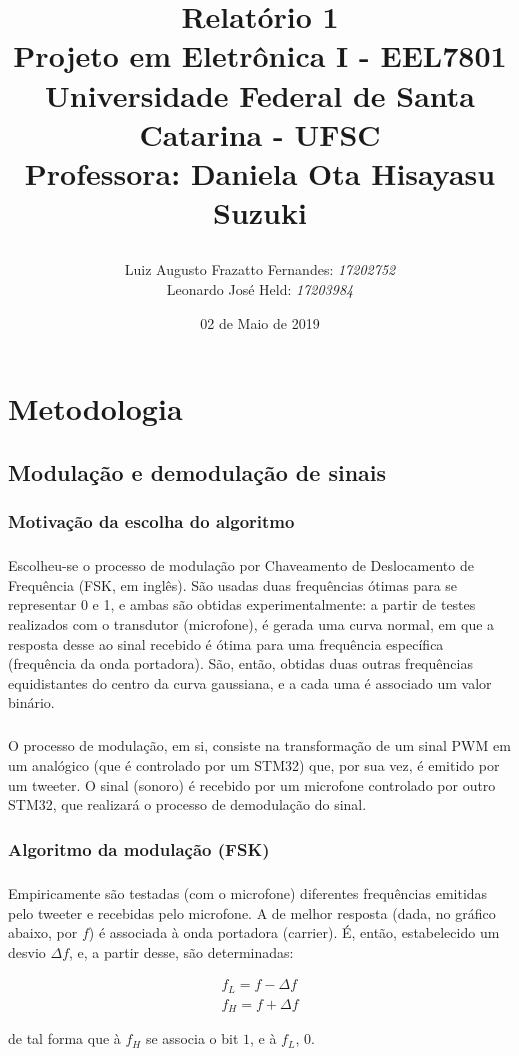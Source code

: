 \documentclass[11pt,a4paper]{report}
\title{Relatório 1  \\
	Projeto em Eletrônica I - EEL7801 \\ \vfill
	\normalsize{Universidade Federal de Santa Catarina - UFSC \\
		Professora: Daniela Ota Hisayasu Suzuki}
	\author{
		{Luiz Augusto Frazatto Fernandes: \it{17202752}} \\
		{Leonardo José Held: \it{17203984}}
	}
}
\date{02 de Maio de 2019}
\begin{document}
	\maketitle
	\setcounter{chapter}{0}
	\chapter{Metodologia}
	\section{Modulação e demodulação de sinais}
	\subsection{Motivação da escolha do algoritmo}
	\paragraph{}
	\paragraph{}
	Escolheu-se o processo de modulação por Chaveamento de Deslocamento de Frequência (FSK, em inglês). São usadas duas frequências ótimas para se representar 0 e 1, e ambas são obtidas experimentalmente: a partir de testes realizados com o transdutor (microfone), é gerada uma curva normal, em que a resposta desse ao sinal recebido é ótima para uma frequência específica (frequência da onda portadora). São, então, obtidas duas outras frequências equidistantes do centro da curva gaussiana, e a cada uma é associado um valor binário.
	\paragraph{}
	O processo de modulação, em si, consiste na transformação de um sinal PWM em um analógico (que é controlado por um STM32) que, por sua vez, é emitido por um tweeter. O sinal (sonoro) é recebido por um microfone controlado por outro STM32, que realizará o processo de demodulação do sinal.
	\subsection{Algoritmo da modulação (FSK)}	
	\paragraph{}
	Empiricamente são testadas (com o microfone) diferentes frequências emitidas pelo tweeter e recebidas pelo microfone. A de melhor resposta (dada, no gráfico abaixo, por $f$) é associada à onda portadora (carrier). É, então, estabelecido um desvio $\Delta{f}$, e, a partir desse, são determinadas:
	\begin{center}
		\begin{align*}
		f_L = f - \Delta{f}\\
		f_H = f + \Delta{f}
		\end{align*}
	\end{center}
	de tal forma que à $f_H$ se associa o bit $1$, e à $f_L$, $0$.
	
\end{document}
